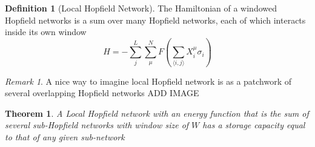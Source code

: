 \documentclass{article}
\newtheorem{theorem}{Theorem}[section]
\theoremstyle{definition}
\newtheorem{definition}{Definition}[section]
\theoremstyle{remark}
\newtheorem*{remark}{Remark}
\begin{document}
    \begin{definition}[Local Hopfield Network]
    The Hamiltonian of a windowed Hopfield networks is a sum over many Hopfield networks, each of which interacts inside its own window
        \begin{equation}
            H=-\sum_j^L\sum_\mu^NF\left(
                \sum_{\langle i,j\rangle}X^\mu_i\sigma_i
            \right)
        \end{equation}
    \end{definition}
    \begin{remark}
        A nice way to imagine local Hopfield network is as a patchwork of several overlapping Hopfield networks ADD IMAGE
    \end{remark}
    \begin{theorem}
        A Local Hopfield network with an energy function that is the sum of several sub-Hopfield networks with window size of $W$ has a storage capacity equal to that of any given sub-network
    \end{theorem}
\end{document}
